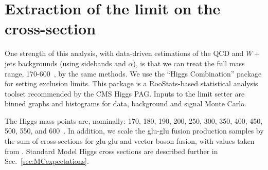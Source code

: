 \section{Extraction of the limit on the cross-section}
\label{sec:limitExtraction}

One strength of this analysis, with data-driven estimations of the QCD
and $W+$jets backgrounds (using sidebands and $\alpha$), is that we
can treat the full mass range, 170-600~\GeV, by the same methods.  We
use the ``Higgs Combination'' package \cite{cite:combine} for setting
exclusion limits. This package is a RooStats\cite{cite:roostats}-based
statistical analysis toolset recommended by the CMS Higgs PAG.  Inputs
to the limit setter are binned graphs and histograms for data,
background and signal Monte Carlo.

The Higgs mass points are, nominally: 170, 180, 190, 200, 250, 300,
350, 400, 450, 500, 550, and 600~\GeV.  In addition,
we scale the
glu-glu fusion production samples by the sum of cross-sections for
glu-glu and vector boson fusion, with values taken from
\cite{cite:higgsxsecbr}.  Standard Model Higgs cross
sections are described further in Sec.~\ref{sec:MCexpectations}.


